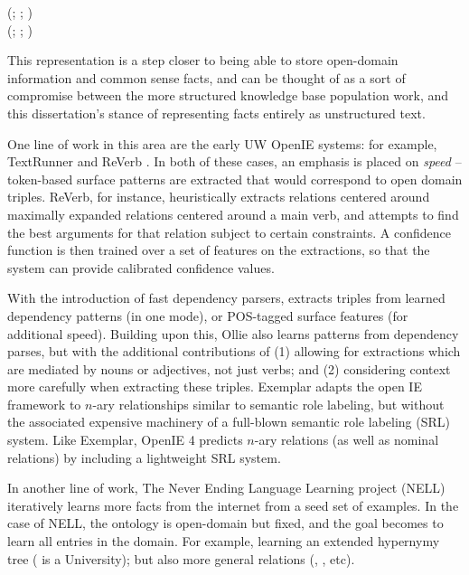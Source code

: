 \begin{displayquote}
  (; ; ) \\
  (; ; )
\end{displayquote}

This representation is a step closer to being able to store open-domain information
  and common sense facts, and can be thought of as a sort of compromise between
  the more structured knowledge base population work, and this dissertation's stance
  of representing facts entirely as unstructured text.

One line of work in this area are the early UW OpenIE systems: for example,
  TextRunner \cite{key:2007yates-textrunner} and
  ReVerb \cite{key:2011fader-reverb}.
In both of these cases, an emphasis is placed on \textit{speed} --
  token-based surface patterns are extracted that would correspond to
  open domain triples.
ReVerb, for instance, heuristically extracts relations centered around maximally expanded
  relations centered around a main verb, and attempts to find the best arguments
  for that relation subject to certain constraints.
A confidence function is then trained over a set of features on the extractions, so that
  the system can provide calibrated confidence values.

With the introduction of fast dependency parsers,
  \cite{key:2010wu-openie} extracts triples from
  learned dependency patterns (in one mode), or POS-tagged surface features (for additional
  speed).
Building upon this, Ollie \cite{key:2012mausam-ollie} also learns patterns from dependency
  parses, but with the additional contributions of (1) allowing for extractions which are
  mediated by nouns or adjectives, not just verbs; and (2) considering context more carefully
  when extracting these triples.
Exemplar \cite{key:2013mesquita-exemplar} adapts the open IE framework to
  $n$-ary relationships similar to semantic role labeling, but without the
  associated expensive machinery of a full-blown semantic role labeling (SRL) system.
Like Exemplar, OpenIE 4 predicts $n$-ary relations (as well as nominal relations) by including
  a lightweight SRL system.

In another line of work, The Never Ending Language Learning project (NELL) \cite{key:2010carlson-nell}
  iteratively learns more facts from the internet
  from a seed set of examples.
In the case of NELL, the ontology is open-domain but fixed, and the goal becomes to learn
  all entries in the domain.
For example, learning an extended hypernymy tree ( is a University);
  but also more general relations (, , etc).


